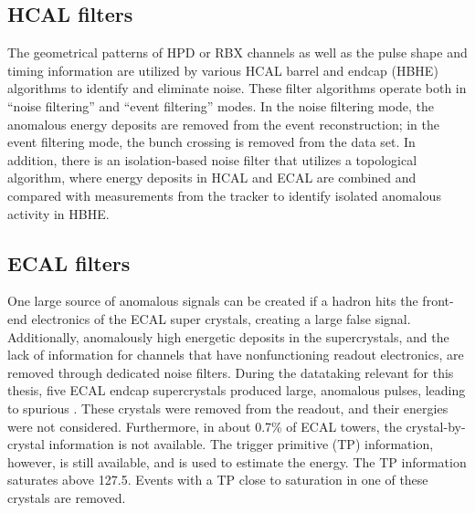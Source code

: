\subsection*{HCAL filters}
\noindent
\justify
The geometrical patterns of HPD or RBX channels as well as the pulse shape and timing information are utilized by various HCAL barrel and endcap (HBHE) algorithms to identify and eliminate noise. 
These filter algorithms operate both in ``noise filtering'' and ``event filtering'' modes.
In the noise filtering mode, the anomalous energy deposits are removed from the event reconstruction; in the event filtering mode, the bunch crossing is removed from the data set. 
In addition, there is an isolation-based noise filter that utilizes a topological algorithm, where energy deposits in HCAL and ECAL are combined
and compared with measurements from the tracker to identify isolated anomalous activity in HBHE. 
\subsection*{ECAL filters}
\noindent
\justify
One large source of anomalous \ptmiss signals can be created if a hadron hits the front-end electronics of the ECAL super crystals, creating a large false signal.  
Additionally, anomalously high energetic deposits in the supercrystals, and the lack of information for channels that have nonfunctioning readout electronics, are removed through dedicated noise filters.
During the datataking relevant for this thesis, five ECAL endcap supercrystals produced large, anomalous pulses, leading to spurious \ptmiss. 
These crystals were removed from the readout, and their energies were not considered.
Furthermore, in about 0.7\% of ECAL towers, the crystal-by-crystal information is not available. 
The trigger primitive (TP) information, however, is still available, and is used to estimate the energy. 
The TP information saturates above 127.5\GeV. Events with a TP close to saturation in one of these crystals are removed.

